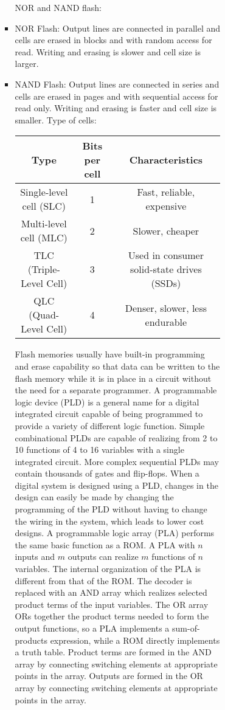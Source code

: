 \documentclass[a4paper,12pt]{article}
\begin{document}
\begin{itemize}
\begin{itemize}
\begin{itemize}
\begin{itemize}
\begin{itemize}
\begin{itemize}
\begin{itemize}
NOR and NAND flash:
\bit
\item NOR Flash: Output lines are connected in parallel and cells are erased in blocks and with random access for read. Writing and erasing is slower and cell size is larger.
\item NAND Flash: Output lines are connected in series and cells are erased in pages and with sequential access for read only. Writing and erasing is faster and cell size is smaller.
\eit
Type of cells:
\begin{longtable}[c]{|c|c|c|}
\hline
Type & Bits per cell & Characteristics \\\hline
Single-level cell (SLC) & 1 & Fast, reliable, expensive \\\hline
Multi-level cell (MLC) & 2 & Slower, cheaper \\\hline
TLC (Triple-Level Cell) & 3 & Used in consumer solid-state drives (SSDs) \\\hline
QLC (Quad-Level Cell) & 4 & Denser, slower, less endurable \\\hline
\end{longtable}
Flash memories usually have built-in programming and erase capability so that data can be written to the flash memory while it is in place in a circuit without the need for a separate programmer.
A programmable logic device (PLD) is a general name for a digital integrated circuit capable of being programmed to provide a variety of different logic function. Simple combinational PLDs are capable of realizing from 2 to 10 functions of 4 to 16 variables with a single integrated circuit. More complex sequential PLDs may contain thousands of gates and flip-flops. When a digital system is designed using a PLD, changes in the design can easily be made by changing the programming of the PLD without having to change the wiring in the system, which leads to lower cost designs.
A programmable logic array (PLA) performs the same basic function as a ROM. A PLA with $n$ inputs and $m$ outputs can realize $m$ functions of $n$ variables. The internal organization of the PLA is different from that of the ROM. The decoder is replaced with an AND array which realizes selected product terms of the input variables. The OR array ORs together the product terms needed to form the output functions, so a PLA implements a sum-of-products expression, while a ROM directly implements a truth table. Product terms are formed in the AND array by connecting switching elements at appropriate points in the array. Outputs are formed in the OR array by connecting switching elements at appropriate points in the array. 


\end{itemize}
\end{itemize}
\end{itemize}
\end{itemize}
\end{itemize}
\end{itemize}
\end{itemize}
\end{document}
